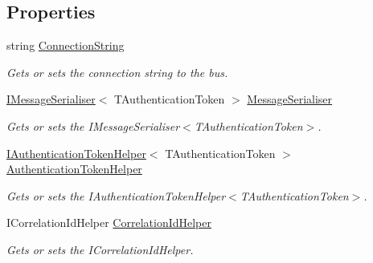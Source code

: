 \subsection*{Properties}
\begin{DoxyCompactItemize}
\item 
string \hyperlink{classCqrs_1_1Azure_1_1ServiceBus_1_1AzureBus_aaccdbc8cd25d3ae4f1a2801d2ad02a96_aaccdbc8cd25d3ae4f1a2801d2ad02a96}{Connection\+String}
\begin{DoxyCompactList}\small\item\em Gets or sets the connection string to the bus. \end{DoxyCompactList}\item 
\hyperlink{interfaceCqrs_1_1Azure_1_1ServiceBus_1_1IMessageSerialiser}{I\+Message\+Serialiser}$<$ T\+Authentication\+Token $>$ \hyperlink{classCqrs_1_1Azure_1_1ServiceBus_1_1AzureBus_ab6f7a7530a01f23ddec8029fe832392d_ab6f7a7530a01f23ddec8029fe832392d}{Message\+Serialiser}
\begin{DoxyCompactList}\small\item\em Gets or sets the I\+Message\+Serialiser$<$\+T\+Authentication\+Token$>$. \end{DoxyCompactList}\item 
\hyperlink{interfaceCqrs_1_1Authentication_1_1IAuthenticationTokenHelper}{I\+Authentication\+Token\+Helper}$<$ T\+Authentication\+Token $>$ \hyperlink{classCqrs_1_1Azure_1_1ServiceBus_1_1AzureBus_a5250b75a5ef26d52a96da74777958519_a5250b75a5ef26d52a96da74777958519}{Authentication\+Token\+Helper}
\begin{DoxyCompactList}\small\item\em Gets or sets the I\+Authentication\+Token\+Helper$<$\+T\+Authentication\+Token$>$. \end{DoxyCompactList}\item 
I\+Correlation\+Id\+Helper \hyperlink{classCqrs_1_1Azure_1_1ServiceBus_1_1AzureBus_aade10189c32052d50e067be90cb4fe1c_aade10189c32052d50e067be90cb4fe1c}{Correlation\+Id\+Helper}
\begin{DoxyCompactList}\small\item\em Gets or sets the I\+Correlation\+Id\+Helper. \end{DoxyCompactList}\item 

\end{DoxyCompactItemize}
